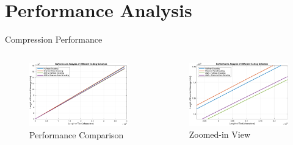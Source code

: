 \documentclass[mathserif, 13pt, aspectratio=1610]{beamer}
\begin{document}
\section{Performance Analysis}
\begin{frame}{Compression Performance}
	\begin{columns}[T]
		\centering
		\begin{figure}[h!]
			\centering
			\includegraphics[width=\textwidth]{performanceAME1.png}
			\caption{Performance Comparison}
		\end{figure}
		\centering
		\begin{figure}[h!]
			\centering
			\includegraphics[width=\textwidth]{performanceAME2.png}
			\caption{Zoomed-in View}
		\end{figure}
	\end{columns}
\end{frame}
\end{document}
